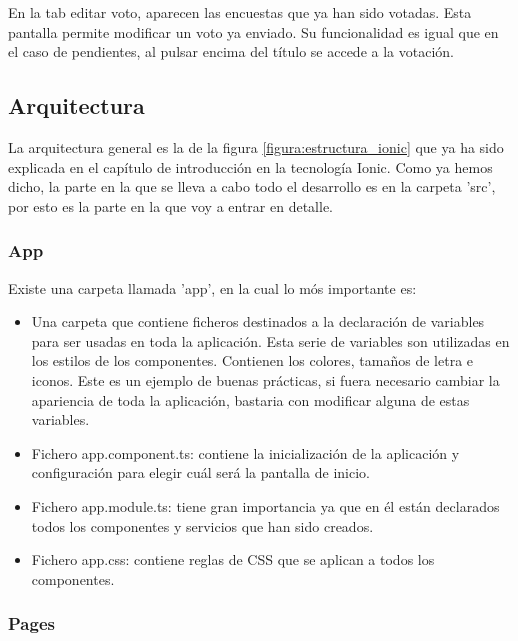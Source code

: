\documentclass[a4paper, 12pt]{book}
\begin{document}
En la tab editar voto, aparecen las encuestas que ya han sido votadas. Esta pantalla permite modificar un voto ya enviado. Su funcionalidad
es igual que en el caso de pendientes, al pulsar encima del t\'itulo se accede a la votaci\'on.




\subsection{Arquitectura} 
\label{sec:arquitectura}

La arquitectura general es la de la figura \ref{figura:estructura_ionic} que ya ha sido explicada en el cap\'itulo de introducci\'on en la
tecnolog\'ia Ionic. Como ya hemos dicho, la parte en la que se lleva a cabo todo el desarrollo es en la carpeta 'src', por esto es la parte
en la que voy a entrar en detalle.

\subsubsection{App} 
\label{sec:app}

Existe una carpeta llamada 'app', en la cual lo m\'os importante es:

\begin{itemize}
\item Una carpeta que contiene ficheros destinados a la declaraci\'on de variables para ser usadas en toda la aplicaci\'on. Esta serie de variables son utilizadas en los estilos de los componentes.
Contienen los colores, tama\~nos de letra e iconos. Este es un ejemplo de buenas pr\'acticas, si fuera necesario cambiar la apariencia de toda la aplicaci\'on, bastaria con modificar alguna de estas variables.

\item Fichero app.component.ts: contiene la inicializaci\'on de la aplicaci\'on y configuraci\'on para elegir cu\'al ser\'a la pantalla de inicio.

\item Fichero app.module.ts: tiene gran importancia ya que en \'el est\'an declarados todos los componentes y servicios que han sido creados.

\item Fichero app.css: contiene reglas de CSS que se aplican a todos los componentes.

\end{itemize}

\subsubsection{Pages} 
\label{sec:pages}
\end{document}
